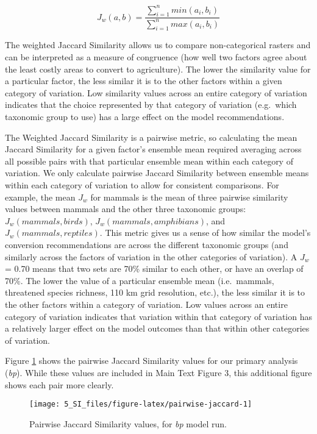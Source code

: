 \documentclass[
]{article}
\begin{document}
\begin{equation}
J_{w} (a,b) = \frac{\sum_{i=1}^n min(a_{i}, b_{i})}{\sum_{i=1}^n max(a_{i}, b_{i})} \label{eq:jac-w}
\end{equation}

The weighted Jaccard Similarity allows us to compare non-categorical rasters and can be interpreted as a measure of congruence (how well two factors agree about the least costly areas to convert to agriculture). The lower the similarity value for a particular factor, the less similar it is to the other factors within a given category of variation. Low similarity values across an entire category of variation indicates that the choice represented by that category of variation (e.g.~which taxonomic group to use) has a large effect on the model recommendations.

The Weighted Jaccard Similarity is a pairwise metric, so calculating the mean Jaccard Similarity for a given factor's ensemble mean required averaging across all possible pairs with that particular ensemble mean within each category of variation. We only calculate pairwise Jaccard Similarity between ensemble means within each category of variation to allow for consistent comparisons. For example, the mean \(J_w\) for mammals is the mean of three pairwise similarity values between mammals and the other three taxonomic groups: \(J_w(mammals, birds)\), \(J_w(mammals,amphibians)\), and \(J_w(mammals,reptiles)\). This metric gives us a sense of how similar the model's conversion recommendations are across the different taxonomic groups (and similarly across the factors of variation in the other categories of variation). A \(J_w\) = 0.70 means that two sets are 70\% similar to each other, or have an overlap of 70\%. The lower the value of a particular ensemble mean (i.e.~mammals, threatened species richness, 110 km grid resolution, etc.), the less similar it is to the other factors within a category of variation. Low values across an entire category of variation indicates that variation within that category of variation has a relatively larger effect on the model outcomes than that within other categories of variation.

Figure \ref{fig:pairwise-jaccard} shows the pairwise Jaccard Similarity values for our primary analysis (\emph{bp}). While these values are included in Main Text Figure 3, this additional figure shows each pair more clearly.



\begin{figure}
\texttt{[image: 5\_SI\_files/figure-latex/pairwise-jaccard-1]} \caption{Pairwise Jaccard Similarity values, for \emph{bp} model run.}\label{fig:pairwise-jaccard}
\end{figure}
\end{document}
